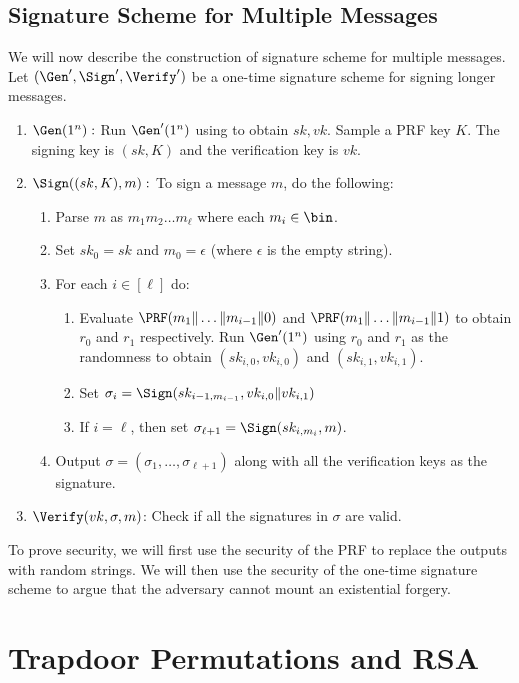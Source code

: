 \subsection{Signature Scheme for Multiple Messages}
We will now describe the construction of signature scheme for multiple messages. Let $(\Gen',\Sign',\Verify')$ be a one-time signature scheme for signing longer messages. 
\begin{enumerate}
    \item $\Gen(1^n):$ Run $\Gen'(1^n)$ using to obtain $sk,vk$. Sample a PRF key $K$. The signing key is $(sk,K)$ and the verification key is $vk$.
    \item $\Sign((sk,K),m):$ To sign a message $m$, do the following:
    \begin{enumerate}
        \item Parse $m$ as $m_1m_2\ldots m_{\ell}$ where each $m_i \in \bin$.
        \item Set $sk_0 = sk$ and $m_0 = \epsilon$ (where $\epsilon$ is the empty string).
        \item For each $i \in [\ell]$ do:
        \begin{enumerate}
            \item Evaluate $\PRF(m_1\|\ldots\|m_{i-1}\|0)$ and $\PRF(m_1\|\ldots\|m_{i-1}\|1)$ to obtain $r_0$ and $r_1$ respectively. Run $\Gen'(1^n)$ using $r_0$ and $r_1$ as the randomness to obtain $(sk_{i,0},vk_{i,0})$ and $(sk_{i,1},vk_{i,1})$.
            \item Set $\sigma_i = \Sign(sk_{i-1,m_{i-1}},vk_{i,0}\|vk_{i,1})$
            \item If $i = \ell$, then set $\sigma_{\ell+1} = \Sign(sk_{i,m_i},m)$.
            
        \end{enumerate}
        \item Output $\sigma = (\sigma_1,\ldots,\sigma_{\ell+1})$ along with all the verification keys as the signature.
    \end{enumerate}
    \item $\Verify(vk,\sigma,m)$: Check if all the signatures in $\sigma$ are valid.
\end{enumerate}

To prove security, we will first use the security of the PRF to replace the outputs with random strings. We will then use the security of the one-time signature scheme to argue that the adversary cannot mount an existential forgery.

\section{Trapdoor Permutations and RSA} 

